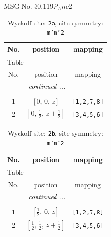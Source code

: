 \documentclass[fleqn,8pt]{jsarticle}
\begin{document}
\setcounter{MaxMatrixCols}{32}

\renewcommand{\tablename}{Table~}
\renewcommand{\figurename}{Figure~}
\begin{center}
\LARGE
MSG No. 30.119\quad$P_{A}nc2$
\end{center}
\renewcommand{\arraystretch}{1.2}
\begin{longtable}{ccc}
\caption{Wyckoff site: {\tt 2a}, site symmetry: {\tt m'm'2}}
 \\
 \hline \hline
No. & position & mapping \\ \hline \endfirsthead

\multicolumn{2}{l}{\tablename\ \thetable{}} \\
 \hline \hline
No. & position & mapping \\ \hline \endhead

 \hline \hline
\multicolumn{2}{r}{\footnotesize\it continued ...} \\ \endfoot

 \hline \hline
\multicolumn{2}{r}{} \\ \endlastfoot

1 & $\left[ 0,\, 0,\, z \right]$ & {\tt [1,2,7,8]} \\ \hline
2 & $\left[ 0,\, \frac{1}{2},\, z + \frac{1}{2} \right]$ & {\tt [3,4,5,6]} \\
\end{longtable}
\renewcommand{\arraystretch}{1.2}
\begin{longtable}{ccc}
\caption{Wyckoff site: {\tt 2b}, site symmetry: {\tt m'm'2}}
 \\
 \hline \hline
No. & position & mapping \\ \hline \endfirsthead

\multicolumn{2}{l}{\tablename\ \thetable{}} \\
 \hline \hline
No. & position & mapping \\ \hline \endhead

 \hline \hline
\multicolumn{2}{r}{\footnotesize\it continued ...} \\ \endfoot

 \hline \hline
\multicolumn{2}{r}{} \\ \endlastfoot

1 & $\left[ \frac{1}{2},\, 0,\, z \right]$ & {\tt [1,2,7,8]} \\ \hline
2 & $\left[ \frac{1}{2},\, \frac{1}{2},\, z + \frac{1}{2} \right]$ & {\tt [3,4,5,6]} \\
\end{longtable}
\end{document}
